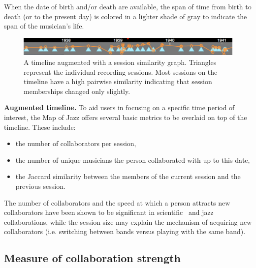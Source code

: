 \documentclass[12pt]{cmuthesis}
\begin{document}
  When the date of birth and/or death are available, the span of time from birth
  to death (or to the present day) is colored in a lighter shade of gray to
  indicate the span of the musician's life.
  \begin{figure}
    \includegraphics[width=\linewidth]{timeline}
    \caption{A timeline augmented with a session similarity graph. Triangles
  represent the individual recording sessions. Most sessions on the
  timeline have a high pairwise similarity indicating that session memberships
  changed only slightly.}
    \label{fig:timeline}
  \end{figure}
  \textbf{Augmented timeline.} To aid users in focusing on a specific time period
  of interest, the Map of Jazz offers several basic metrics to be overlaid on top
  of the timeline. These include:
  \begin{itemize}
    \item the number of collaborators per session,
    \item the number of unique musicians the person collaborated with up to this date,
    \item the Jaccard similarity between the members of the current session and
    the previous session.
  \end{itemize}
  The number of collaborators and the speed at which a person attracts new
  collaborators have been shown to be significant in scientific~\cite{Petersen2012}
  and jazz~\cite{Pinheiro2009} collaborations, while the session size may explain
  the mechanism of acquiring new collaborators (i.e. switching between bands
  versus playing with the same band).



  \subsection{Measure of collaboration strength}
\end{document}
